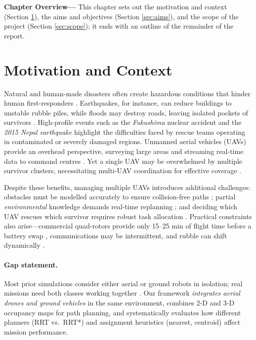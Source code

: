 \documentclass[12pt,a4paper]{report}
\begin{document}
\noindent
\textbf{Chapter Overview—} This chapter sets out the motivation and context
(Section \ref{sec:motivation}), the aims and objectives (Section \ref{sec:aims}), and
the scope of the project (Section \ref{sec:scope}); it ends with an outline of the
remainder of the report.

\section{Motivation and Context}
\label{sec:motivation}
Natural and human-made disasters often create hazardous conditions that hinder human
first-responders \cite{Auclair2021CollapseRisk,Daud2022DroneDisaster,Erdelj2017MultiUAV}.
Earthquakes, for instance, can reduce buildings to unstable rubble piles, while floods
may destroy roads, leaving isolated pockets of survivors \cite{Daud2022DroneDisaster}.
High-profile events such as the \emph{Fukushima} nuclear accident \cite{UNDRR2015Fukushima}
and the \emph{2015 Nepal earthquake} \cite{Murphy2016DisasterRoboticsNepal} highlight the
difficulties faced by rescue teams operating in contaminated or severely damaged regions.
Unmanned aerial vehicles (UAVs) provide an overhead perspective, surveying large areas and
streaming real-time data to command centres \cite{Merei2025UAVObstacleSurvey}.  
Yet a single UAV may be overwhelmed by multiple survivor clusters, necessitating
multi-UAV coordination for effective coverage \cite{Erdelj2017MultiUAV}.

Despite these benefits, managing multiple UAVs introduces additional challenges:
obstacles must be modelled accurately to ensure collision-free paths \cite{Merei2025UAVObstacleSurvey};
partial \emph{environmental} knowledge demands real-time replanning
\cite{Oleynikova2018ReplanDynamic,Zhang2024ShrinkingPOMCP}; and deciding which UAV rescues which
survivor requires robust task allocation \cite{Gerkey2004Taxonomy}.  
Practical constraints also arise—commercial quad-rotors provide only
15–25 min of flight time before a battery swap \cite{DroneBattery2023}, communications
may be intermittent, and rubble can shift dynamically \cite{Murphy2014DisasterRobotics}.

\paragraph{Gap statement.}
Most prior simulations consider either aerial or ground robots in isolation;
real missions need both classes working together
\cite{Erdelj2017MultiUAV,Daud2022DroneDisaster}.  
Our framework \emph{integrates aerial drones and ground vehicles} in the same
environment, combines 2-D and 3-D occupancy maps for path planning, and
systematically evaluates how different planners (RRT vs.\ RRT*) and assignment
heuristics (nearest, centroid) affect mission performance.
\end{document}
